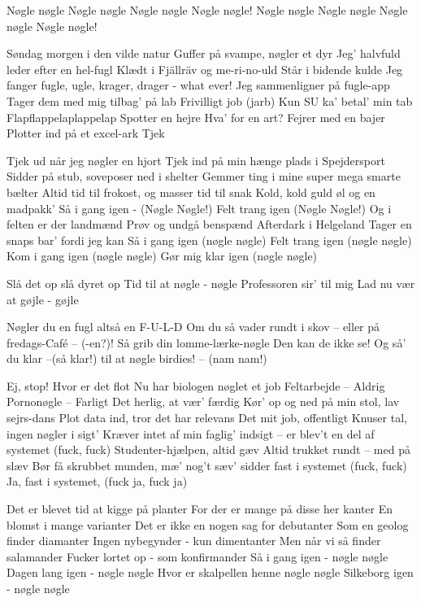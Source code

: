 \documentclass[a4paper,11pt]{article}
\begin{document}
\begin{song}
   Nøgle nøgle
Nøgle nøgle
Nøgle nøgle
Nøgle nøgle!
Nøgle nøgle
Nøgle nøgle
Nøgle nøgle
Nøgle nøgle!


 Søndag morgen i den vilde natur
Guffer på svampe, nøgler et dyr
Jeg’ halvfuld
leder efter en hel-fugl
Klædt i Fjällräv og me-ri-no-uld
Står i bidende kulde
Jeg fanger fugle, ugle, krager, drager - what ever!
Jeg sammenligner på fugle-app
Tager dem med mig tilbag’ på lab
Frivilligt job (jarb)
Kun SU ka' betal’ min tab
Flapflappelaplappelap
Spotter en hejre
 Hva' for en art?
 Fejrer med en bajer
 Plotter ind på et excel-ark
 Tjek


 Tjek ud når jeg nøgler en hjort
Tjek ind på min hænge plads i Spejdersport 
Sidder på stub, soveposer ned i shelter
Gemmer ting i mine super mega smarte bælter 
Altid tid til frokost, og masser tid til snak
Kold, kold guld øl og en madpakk’
Så i gang igen - (Nøgle Nøgle!)
Felt trang igen (Nøgle Nøgle!)
Og i felten er der landmænd
Prøv og undgå benspænd
Afterdark i Helgeland
Tager en snaps bar’ fordi jeg kan
Så i gang igen (nøgle nøgle)
Felt trang igen (nøgle nøgle)
Kom i gang igen (nøgle nøgle)
Gør mig klar igen (nøgle nøgle)


 Slå det op slå dyret op
Tid til at nøgle - nøgle
Professoren sir’ til mig
Lad nu vær at gøjle - gøjle 


 Nøgler du en fugl
 altså en F-U-L-D
 Om du så vader rundt i skov –
 eller på fredags-Café – (-en?)!
 Så grib din lomme-lærke-nøgle
 Den kan de ikke se!
 Og så’ du klar
 --(så klar!)
 til at nøgle birdies!
 -- (nam nam!)


 Ej, stop!
 Hvor er det flot
Nu har biologen nøglet et job
Feltarbejde -- Aldrig
Pornonøgle -- Farligt
Det herlig, at vær' færdig
Kør' op og ned på min stol, lav sejrs-dans
Plot data ind, tror det har relevans
Det mit job, offentligt
Knuser tal, ingen nøgler i sigt'
Kræver intet af min faglig' indsigt --
er blev't en del af systemet (fuck, fuck)
Studenter-hjælpen, altid gæv
Altid trukket rundt -- med på slæv
Bør få skrubbet munden, mæ' nog't sæv'
sidder fast i systemet (fuck, fuck)
Ja, fast i systemet, (fuck ja, fuck ja)


 Det er blevet tid at kigge på planter 
For der er mange på disse her kanter
En blomst i mange varianter 
Det er ikke en nogen sag for debutanter 
Som en geolog finder diamanter
Ingen nybegynder - kun dimentanter
Men når vi så finder salamander
Fucker lortet op - som konfirmander 
Så i gang igen - nøgle nøgle
Dagen lang igen - nøgle nøgle
Hvor er skalpellen henne nøgle nøgle
Silkeborg igen - nøgle nøgle 



\end{song}
\end{document}
